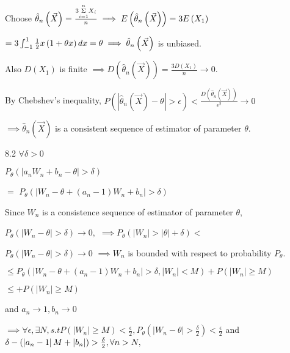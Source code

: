 \documentclass{article}
\begin{document}
 Choose $\hat{\theta}_{n}\left( \vec{X}\right) =\frac{3\underset{%
i=1}{\overset{n}{\Sigma }}X_{i}}{n}\implies E\left( \hat{\theta}_{n}\left( 
\vec{X}\right) \right) =3E\left( X_{1}\right) $

$=3\int_{-1}^{1}\frac{1}{2}x\left( 1+\theta x\right) dx=\theta \implies \hat{%
\theta}_{n}\left( \vec{X}\right) $ is unbiased.

Also $D\left( X_{1}\right) $ is finite $\implies D\left( \hat{\theta}%
_{n}\left( \vec{X}\right) \right) =\frac{3D\left( X_{1}\right) }{n}%
\rightarrow 0.$

By Chebshev's inequality, $P\left( \left\vert \hat{\theta}_{n}\left( \vec{X}%
\right) -\theta \right\vert >\epsilon \right) <\frac{D\left( \hat{\theta}%
_{n}\left( \vec{X}\right) \right) }{\epsilon ^{2}}\rightarrow 0$

$\implies \hat{\theta}_{n}\left( \vec{X}\right) $ is a consistent sequence
of estimator of parameter $\theta .$

8.2 $\forall \delta >0$

$P_{\theta }\left( \left\vert a_{n}W_{n}+b_{n}-\theta \right\vert >\delta
\right) $

$=$ $P_{\theta }\left( \left\vert W_{n}-\theta +\left( a_{n}-1\right)
W_{n}+b_{n}\right\vert >\delta \right) $

Since $W_{n}$ is a consistence sequence of estimator of parameter $\theta ,$

$P_{\theta }\left( \left\vert W_{n}-\theta \right\vert >\delta \right)
\rightarrow 0,$ $\implies P_{\theta }\left( \left\vert W_{n}\right\vert
>\left\vert \theta \right\vert +\delta \right) <$

$P_{\theta }\left( \left\vert W_{n}-\theta \right\vert >\delta \right)
\rightarrow 0$ $\implies W_{n}$ is bounded with respect to probability $%
P_{\theta }$.

$\leq P_{\theta }\left( \left\vert W_{n}-\theta +\left( a_{n}-1\right)
W_{n}+b_{n}\right\vert >\delta ,\left\vert W_{n}\right\vert <M\right)
+P\left( \left\vert W_{n}\right\vert \geq M\right) $

\bigskip $\leq +P(\left\vert W_{n}\right\vert \geq M)$

and $a_{n}\rightarrow 1,b_{n}\rightarrow 0$

$\implies \forall \epsilon ,\exists N,s.tP(\left\vert W_{n}\right\vert \geq
M)<\frac{\epsilon }{2},P_{\theta }\left( \left\vert W_{n}-\theta \right\vert
>\frac{\delta }{2}\right) <\frac{\epsilon }{2}$ and $\delta -\left(
\left\vert a_{n}-1\right\vert M+\left\vert b_{n}\right\vert \right) >\frac{%
\delta }{2},\forall n>N,$
\end{document}
